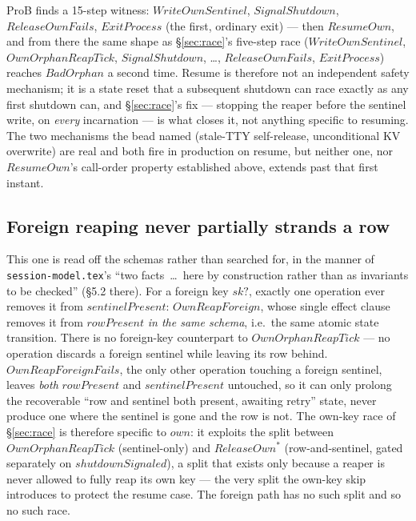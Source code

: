 \documentclass[a4paper,10pt,fleqn]{article}
\begin{document}
ProB finds a 15-step witness: $WriteOwnSentinel$, $SignalShutdown$,
$ReleaseOwnFails$, $ExitProcess$ (the first, ordinary exit) --- then
$ResumeOwn$, and from there the same shape as \S\ref{sec:race}'s
five-step race ($WriteOwnSentinel$, $OwnOrphanReapTick$,
$SignalShutdown$, \ldots, $ReleaseOwnFails$, $ExitProcess$) reaches
$BadOrphan$ a second time.  Resume is therefore not an independent
safety mechanism; it is a state reset that a subsequent shutdown can
race exactly as any first shutdown can, and \S\ref{sec:race}'s fix ---
stopping the reaper before the sentinel write, on \emph{every}
incarnation --- is what closes it, not anything specific to resuming.
The two mechanisms the bead named (stale-TTY self-release, unconditional
KV overwrite) are real and both fire in production on resume, but
neither one, nor $ResumeOwn$'s call-order property established above,
extends past that first instant.

\subsection{Foreign reaping never partially strands a row}

This one is read off the schemas rather than searched for, in the
manner of \texttt{session-model.tex}'s ``two facts~\ldots~here by
construction rather than as invariants to be checked'' (\S 5.2 there).
For a foreign key $sk?$, exactly one operation ever removes it from
$sentinelPresent$: $OwnReapForeign$, whose single effect clause removes
it from $rowPresent$ \emph{in the same schema}, i.e.\ the same atomic
state transition.  There is no foreign-key counterpart to
$OwnOrphanReapTick$ --- no operation discards a foreign sentinel while
leaving its row behind.  $OwnReapForeignFails$, the only other operation
touching a foreign sentinel, leaves \emph{both} $rowPresent$ and
$sentinelPresent$ untouched, so it can only prolong the recoverable
``row and sentinel both present, awaiting retry'' state, never produce
one where the sentinel is gone and the row is not.  The own-key race of
\S\ref{sec:race} is therefore specific to $own$: it exploits the split
between $OwnOrphanReapTick$ (sentinel-only) and $ReleaseOwn{}^*$
(row-and-sentinel, gated separately on $shutdownSignaled$), a split that
exists only because a reaper is never allowed to fully reap its own key
--- the very split the own-key skip introduces to protect the resume
case.  The foreign path has no such split and so no such race.

\end{document}
